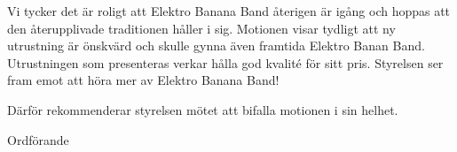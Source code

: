 \documentclass[../_main/handlingar.tex]{subfiles}
\begin{document}
\motionssvar

Vi tycker det är roligt att Elektro Banana Band återigen är igång och hoppas att den återupplivade traditionen håller i sig. Motionen visar tydligt att ny utrustning är önskvärd och skulle gynna även framtida Elektro Banan Band. Utrustningen som presenteras verkar hålla god kvalité för sitt pris. Styrelsen ser fram emot att höra mer av Elektro Banana Band!

Därför rekommenderar styrelsen mötet att bifalla motionen i sin helhet.


\begin{signatures}{1}
    \ist
    \signature{\ordf}{Ordförande}
\end{signatures}
\end{document}
